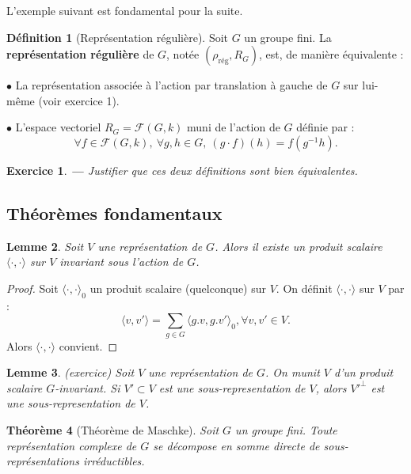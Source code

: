 \documentclass[a4paper]{article}
\newcounter{question}
\newtheorem{enonce}{Exercice}
\newenvironment{exo}[0]{\begin{enonce}{\bf ---}\rm\setcounter{question}{1}}{\end{enonce}}
\theoremstyle{definition} %
\newtheorem{Def}{Définition}[section] %
\theoremstyle{plain} %
\newtheorem{Lem}[Def]{Lemme} %
\newtheorem{Thm}[Def]{Théorème} %
\theoremstyle{remark} %
\begin{document}
 L'exemple suivant est fondamental pour la suite.
 
 \begin{Def}[Représentation régulière]
 	\hspace*{\fill}
 	
 	Soit $G$ un groupe fini. La \textbf{représentation régulière} de $G$, notée $(\rho_{\mathrm{rég}},R_G)$, est, de manière équivalente : 
 	
 	$\bullet$ La représentation associée à l'action par translation à gauche de $G$ sur lui-même (voir exercice 1).
 	
 	$\bullet$ L'espace vectoriel $R_G = \mathcal{F}(G,k)$ muni de l'action de $G$ définie par :
 	$$\forall f \in \mathcal{F}(G,k),\ \forall g,h \in G,\ \left(g \cdot f\right) (h) = f(g^{-1} h).$$
 \end{Def}
 
 \begin{exo}
 	Justifier que ces deux définitions sont bien équivalentes.
 \end{exo}

\subsection{Théorèmes fondamentaux}

\begin{Lem}\label{lemProduit_scalaire_invariant}
Soit $V$ une représentation de $G$. Alors il existe un produit scalaire $\langle \cdot, \cdot  \rangle$ sur $V$ invariant sous l'action de $G$.
\end{Lem}

\begin{proof}
Soit $\langle \cdot, \cdot  \rangle_0$ un produit scalaire (quelconque) sur $V$. On définit $\langle \cdot, \cdot \rangle$ sur $V$ par : \[\langle v,v'\rangle =\sum_{g\in G} \langle g.v,g.v'\rangle_0, \forall v,v'\in V.\] Alors $\langle \cdot, \cdot \rangle$ convient.
\end{proof}

\begin{Lem}\label{lemOrhtogonal_sous_représentation}(exercice)
Soit $V$ une représentation de $G$. On munit $V$ d'un produit scalaire $G$-invariant. Si $V'\subset V$ est une sous-representation de $V$, alors $V'^\perp$ est une sous-representation de $V$.
\end{Lem}
 
 \begin{Thm}[Théorème de Maschke]
 	\hspace*{\fill}
 	
 	Soit $G$ un groupe fini. Toute représentation complexe de $G$ se décompose en somme directe de sous-représentations irréductibles.
 	
 \end{Thm}
 
\end{document}
